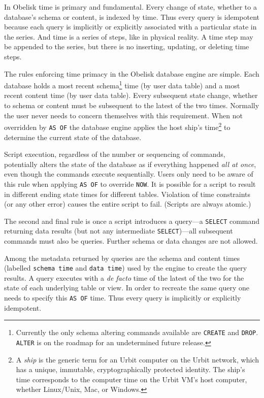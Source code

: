 \documentclass[twoside]{article}
\begin{document}
In Obelisk time is primary and fundamental. Every change of state, whether to a database's schema or content, is indexed by time. Thus every query is idempotent because each query is implicitly or explicitly associated with a particular state in the series. And time is a series of steps, like in physical reality. A time step may be appended to the series, but there is no inserting, updating, or deleting time steps.

The rules enforcing time primacy in the Obelisk database engine are simple. Each database holds a most recent schema\footnote{Currently the only schema altering commands available are \lstinline[style=inlinecode]{CREATE} and \lstinline[style=inlinecode]{DROP}. \lstinline[style=inlinecode]{ALTER} is on the roadmap for an undetermined future release.} time (by user data table) and a most recent content time (by user data table). Every subsequent state change, whether to schema or content must be subsequent to the latest of the two times. Normally the user never needs to concern themselves with this requirement. When not overridden by \lstinline[style=inlinecode]{AS OF} the database engine applies the host ship's time\footnote{A \emph{ship} is the generic term for an Urbit computer on the Urbit network, which has a unique, immutable, cryptographically protected identity. The ship's time corresponds to the computer time on the Urbit VM's host computer, whether Linux/Unix, Mac, or Windows.} to determine the current state of the database.

Script execution, regardless of the number or sequencing of commands, potentially alters the state of the database as if everything happened \emph{all at once}, even though the commands execute sequentially. Users only need  to be aware of this rule when applying \lstinline[style=inlinecode]{AS OF} to override \lstinline[style=inlinecode]{NOW}. It is possible for a script to result in different ending state times for different tables.  Violation of time constraints (or any other error) causes the entire script to fail. (Scripts are always atomic.)

\sloppy
The second and final rule is once a script introduces a query---a \lstinline[style=inlinecode]{SELECT} command returning data results (but not any intermediate \lstinline[style=inlinecode]{SELECT})---all subsequent commands must also be queries. Further schema or data changes are not allowed.

Among the metadata returned by queries are the schema and content times (labelled \lstinline[style=inlinecode]{schema time} and \lstinline[style=inlinecode]{data time}) used by the engine to create the query results. A query executes with a \emph{de facto} time of the latest of the two for the state of each underlying table or view. In order to recreate the same query one needs to specify this \lstinline[style=inlinecode]{AS OF} time. Thus every query is implicitly or explicitly idempotent. 
\end{document}
